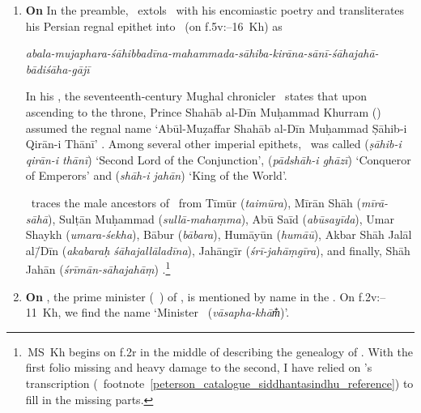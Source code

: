 \begin{enumerate}[topsep=0pt]
\begin{itemize}
    \end{itemize}
    \item \textbf{On \Shahjahan}\quad\label{shahjahan_epithet_siddhantasindhu} In the preamble, \Nityananda\ extols \Shahjahan\ with his encomiastic poetry \parencite[\eg \vid][129]{Minkowskilearnedbrahmin} and transliterates his Persian regnal epithet into \Nagari\ (on f.\thinspace 5v:--16~Kh) as    
    \begin{multicols}{2}
    \columnbreak
    
    \textit{abala-mujaphara-śāhibbadīna-mahammada-sāhiba-kirāna-sānī-śāhajahā-bādiśāha-gājī}
    \end{multicols}
        In his \Padshahnama, the seventeenth-century Mughal chronicler \AbdalHamidLahori\ states that upon ascending to the throne, Prince Shahāb al-Dīn Muḥammad Khurram (\Shahjahan) assumed the regnal name `Abū\Alif l-Muẓaffar Shahāb al-Dīn Muḥammad Ṣāhib-i Qirān-i Thānī' \parencite[6]{Elliot}. Among several other imperial epithets, \Shahjahan\ was called  (\textit{ṣāhib-i qirān-i thānī}) `Second Lord of the Conjunction',  (\textit{pādshāh-i ghāzī}) `Conqueror of Emperors' and  (\textit{shāh-i jahān}) `King of the World'.
        
       \Nityananda\ traces the male ancestors of \Shahjahan\ from Tīmūr (\textit{taimūra}), Mīrān Shāh (\textit{mīrā-sāhā}), Sulṭān Muḥammad (\textit{sullā-mahaṃma}), Abū Sa\Ayn īd (\textit{abūsayīda}), Umar Shaykh (\textit{umara-śekha}), Bābur (\textit{bābara}), Humāyūn (\textit{humāū}), Akbar Shāh Jalāl al\=/Dīn (\textit{akabaraḥ śāha\-jallāladīna}), Jahāngīr (\textit{śrī-jahāṃgīra}), and finally, Shāh Jahān (\textit{śrīmān-sāhajahāṃ}) \parencite[vv.--11 on p.]{PetersonCatalogue}.\footnote{\,MS~Kh begins on f.\thinspace 2r in the middle of describing the genealogy of \Shahjahan. With the first folio missing and heavy damage to the second, I have relied on \citeauthor{PetersonCatalogue}'s transcription (\vid\ footnote~\ref{peterson_catalogue_siddhantasindhu_reference}) to fill in the missing parts.}
     \item \textbf{On \AsafKhanshort}\label{asaf_khan_siddhantasindhu}\quad \AsafKhan, the prime minister (\vazir\idafaconsonant\ \azam) of \Shahjahan, is mentioned by name in the \Siddhantasindhu. On f.\thinspace 2v:--11~Kh, we find the name  `Minister \AsafKhanshort\ (\textit{vāsapha-khām̐})'.
     

\end{enumerate}
